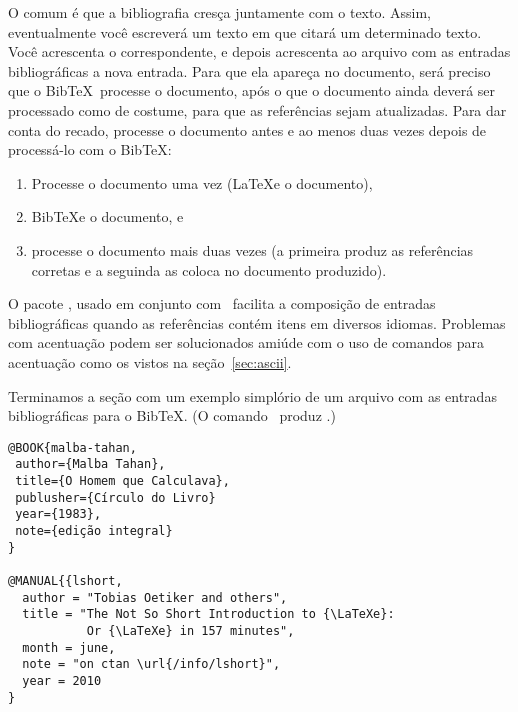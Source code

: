 O comum é que a bibliografia cresça juntamente com o texto. Assim,
eventualmente você escreverá um texto em que citará um determinado
texto. Você acrescenta o  correspondente, e depois
acrescenta ao arquivo com as entradas bibliográficas a nova
entrada. Para que ela apareça no documento, será preciso que o
Bib\TeX\ processe o documento, após o que o documento ainda deverá ser
processado como de costume, para que as referências sejam
atualizadas. Para dar conta do recado, processe o documento antes e
ao menos duas vezes depois de processá-lo com o Bib\TeX:
\begin{enumerate}
\item Processe o documento uma vez (\LaTeX e o documento),
\item Bib\TeX e o documento, e
\item processe o documento mais duas vezes (a primeira produz as
  referências corretas e a seguinda as coloca no documento produzido).
\end{enumerate}

O pacote , usado em conjunto com~
facilita a composição de entradas bibliográficas quando as referências
contém itens em diversos idiomas. Problemas com acentuação podem ser
solucionados amiúde com o uso de comandos para acentuação como os
vistos na seção~\ref{sec:ascii}. 

Terminamos a seção com um exemplo simplório de um arquivo com as
entradas bibliográficas para o Bib\TeX. (O comando~
produz \LaTeXe.)

\begin{verbatim}
@BOOK{malba-tahan,
 author={Malba Tahan},
 title={O Homem que Calculava},
 publusher={Círculo do Livro}
 year={1983},
 note={edição integral}
}

@MANUAL{{lshort,
  author = "Tobias Oetiker and others",
  title = "The Not So Short Introduction to {\LaTeXe}:
           Or {\LaTeXe} in 157 minutes",
  month = june,
  note = "on ctan \url{/info/lshort}",
  year = 2010
}
\end{verbatim}

